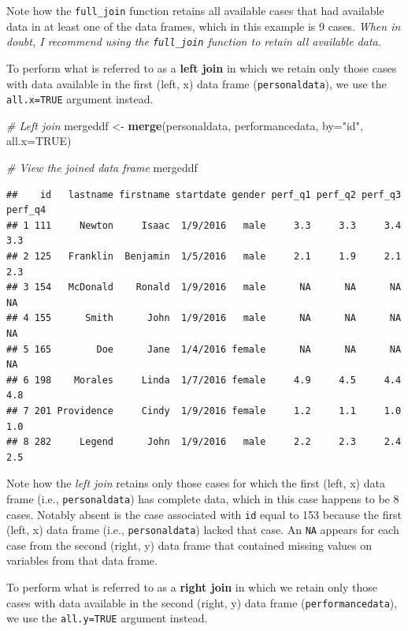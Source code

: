 \documentclass[]{book}
\newenvironment{Shaded}{\begin{snugshade}}{\end{snugshade}}
\newcommand{\KeywordTok}[1]{\textcolor[rgb]{0.13,0.29,0.53}{\textbf{#1}}}
\newcommand{\DataTypeTok}[1]{\textcolor[rgb]{0.13,0.29,0.53}{#1}}
\newcommand{\StringTok}[1]{\textcolor[rgb]{0.31,0.60,0.02}{#1}}
\newcommand{\CommentTok}[1]{\textcolor[rgb]{0.56,0.35,0.01}{\textit{#1}}}
\newcommand{\OtherTok}[1]{\textcolor[rgb]{0.56,0.35,0.01}{#1}}
\newcommand{\NormalTok}[1]{#1}
\begin{document}
Note how the \texttt{full\_join} function retains all available cases
that had available data in at least one of the data frames, which in
this example is 9 cases. \emph{When in doubt, I recommend using the
\texttt{full\_join} function to retain all available data.}

To perform what is referred to as a \textbf{left join} in which we
retain only those cases with data available in the first (left, x) data
frame (\texttt{personaldata}), we use the \texttt{all.x=TRUE} argument
instead.

\begin{Shaded}
\begin{Highlighting}[]
\CommentTok{# Left join }
\NormalTok{mergeddf <-}\StringTok{ }\KeywordTok{merge}\NormalTok{(personaldata, performancedata, }\DataTypeTok{by=}\StringTok{"id"}\NormalTok{, }\DataTypeTok{all.x=}\OtherTok{TRUE}\NormalTok{)}

\CommentTok{# View the joined data frame}
\NormalTok{mergeddf}
\end{Highlighting}
\end{Shaded}

\begin{verbatim}
##    id   lastname firstname startdate gender perf_q1 perf_q2 perf_q3 perf_q4
## 1 111     Newton     Isaac  1/9/2016   male     3.3     3.3     3.4     3.3
## 2 125   Franklin  Benjamin  1/5/2016   male     2.1     1.9     2.1     2.3
## 3 154   McDonald    Ronald  1/9/2016   male      NA      NA      NA      NA
## 4 155      Smith      John  1/9/2016   male      NA      NA      NA      NA
## 5 165        Doe      Jane  1/4/2016 female      NA      NA      NA      NA
## 6 198    Morales     Linda  1/7/2016 female     4.9     4.5     4.4     4.8
## 7 201 Providence     Cindy  1/9/2016 female     1.2     1.1     1.0     1.0
## 8 282     Legend      John  1/9/2016   male     2.2     2.3     2.4     2.5
\end{verbatim}

Note how the \emph{left join} retains only those cases for which the
first (left, x) data frame (i.e., \texttt{personaldata}) has complete
data, which in this case happens to be 8 cases. Notably absent is the
case associated with \texttt{id} equal to 153 because the first (left,
x) data frame (i.e., \texttt{personaldata}) lacked that case. An
\texttt{NA} appears for each case from the second (right, y) data frame
that contained missing values on variables from that data frame.

To perform what is referred to as a \textbf{right join} in which we
retain only those cases with data available in the second (right, y)
data frame (\texttt{performancedata}), we use the \texttt{all.y=TRUE}
argument instead.
\end{document}
